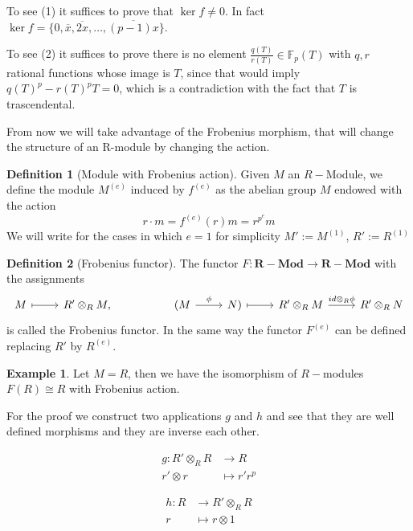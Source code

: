 \documentclass[leqno]{article}
\theoremstyle{definition}
\newtheorem{definition}{Definition}[section]
\newtheorem{example}{Example}[section]
\newcommand{\catname}[1]{{\mathbf{#1}}}
\newcommand{\Mod}{\catname{R-Mod}}
\begin{document}
To see (1) it suffices to prove that $\ker f\neq 0$. In fact $\ker f = \{0, \overline{x}, \overline{2x}, \ldots, \overline{(p-1)x}\}$.

To see (2) it suffices to prove there is no element $\frac{q(T)}{r(T)}\in \mathbb{F}_p(T)$ with $q, r$ rational functions whose image is  $T$, since that would imply  $q(T)^p-r(T)^pT = 0$, which is a contradiction with the fact that $T$ is trascendental.

From now we will take advantage of the Frobenius morphism, that will change the structure of an R-module by changing the action.

\begin{definition}[Module with Frobenius action] Given $M$ an  $R-$Module, we define the module  $M^{(e)}$ induced by  $f^{(e)}$ as the abelian group $M$ endowed with the action
  \[
  r \cdot  m  = f ^{(e)}(r)m = r ^{p^e} m
  \] 
We will write for the cases in which $e=1$ for simplicity $M':=M ^{(1)}$, $R':=R ^{(1)}$
\end{definition}


\begin{definition}[Frobenius functor] The functor $F:\Mod \to \Mod$ with the assignments 
\[\begin{tikzcd}
	M & {R'\otimes_RM,} && {(M} & {N)} & {R'\otimes_R M} & {R'\otimes_RN}
	\arrow["\phi", from=1-4, to=1-5]
	\arrow["{id\otimes_R\phi}", from=1-6, to=1-7]
	\arrow[maps to, from=1-5, to=1-6]
	\arrow[maps to, from=1-1, to=1-2]
\end{tikzcd}\]
is called the Frobenius functor. In the same way the functor $F ^{(e)}$ can be defined replacing $R'$ by  $R ^{(e)}$.
\end{definition}

\begin{example} Let $M = R$, then we have the isomorphism of $R-$modules $F(R) \cong R$ with Frobenius action.

For the proof we construct two applications $g$ and  $h$ and see that they are well defined morphisms and they are inverse each other.

 \begin{minipage}{0.5\textwidth}
   \begin{align*}
	 g: R'\otimes _R R &\to  R \\
	 r'\otimes r &\mapsto r'r^p
   \end{align*}
\end{minipage}
\begin{minipage}{0.5\textwidth}
\begin{align*}
  h: R &\to  R'\otimes_R R\\
  r&\mapsto r\otimes 1
\end{align*}
\end{minipage}
\end{example}
\end{document}
